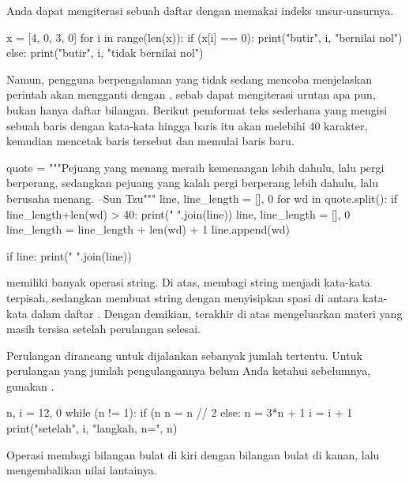 Anda dapat mengiterasi sebuah daftar dengan memakai indeks unsur-unsurnya.
\begin{pythonconsole}
x = [4, 0, 3, 0]
for i in range(len(x)):
    if (x[i] == 0):
        print("butir", i, "bernilai nol")
    else:
        print("butir", i, "tidak bernilai nol")

\end{pythonconsole}
Namun, pengguna \python{} berpengalaman yang tidak sedang mencoba menjelaskan 
perintah 
akan mengganti 
dengan , sebab
 dapat mengiterasi urutan apa pun, bukan hanya
daftar bilangan.
Berikut pemformat teks sederhana yang mengisi sebuah baris dengan kata-kata hingga
baris itu akan melebihi $40$ karakter, kemudian
mencetak baris tersebut dan memulai baris baru.
\begin{pythonconsole}
quote = """Pejuang yang menang meraih kemenangan lebih dahulu, lalu pergi berperang, 
sedangkan pejuang yang kalah pergi berperang lebih dahulu, lalu berusaha menang. 
--Sun Tzu"""
line, line_length = [], 0
for wd in quote.split():
    if line_length+len(wd) > 40:
        print(" ".join(line))
        line, line_length = [], 0
    line_length = line_length + len(wd) + 1
    line.append(wd)

if line:
    print(" ".join(line))

\end{pythonconsole}
\python{} memiliki banyak operasi string.
Di atas,  membagi string menjadi kata-kata terpisah, sedangkan
 membuat string dengan menyisipkan spasi di antara kata-kata dalam daftar 
.
Dengan demikian,  terakhir di atas mengeluarkan materi yang masih tersisa
setelah perulangan  selesai.

Perulangan  dirancang untuk dijalankan sebanyak
jumlah tertentu.
Untuk perulangan yang jumlah pengulangannya belum Anda ketahui sebelumnya, 
gunakan .%
\begin{pythonconsole}
n, i = 12, 0
while (n != 1):
    if (n %
        n = n // 2
    else:
        n = 3*n + 1
    i = i + 1
    print("setelah", i, "langkah, n=", n)
    
\end{pythonconsole}
Operasi \inlinecode{//} membagi bilangan bulat di kiri dengan bilangan bulat di kanan, lalu mengembalikan nilai lantainya.


